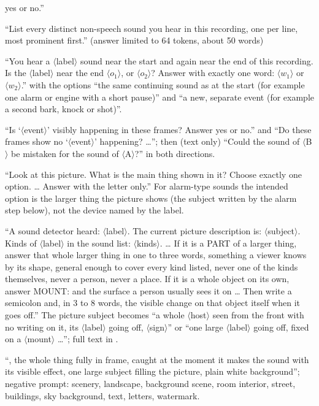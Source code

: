 \begin{description}[style=nextline]
  yes or no.''
\item[Listener inventory] ``List every distinct non-speech sound you hear in this recording, one per line, most prominent
  first.'' (answer limited to 64 tokens, about 50 words)
\item[Grouping (Qwen3-Omni, both orders)] ``You hear a $\langle$label$\rangle$ sound near the start and again near the end
  of this recording. Is the $\langle$label$\rangle$ near the end $\langle o_1\rangle$, or $\langle o_2\rangle$? Answer with
  exactly one word: $\langle w_1\rangle$ or $\langle w_2\rangle$.'' with the options ``the same continuing sound as at the
  start (for example one alarm or engine with a short pause)'' and ``a new, separate event (for example a second bark,
  knock or shot)''.
\item[Depict-event] ``Is `$\langle$event$\rangle$' visibly happening in these frames? Answer yes or no.'' and ``Do these
  frames show no `$\langle$event$\rangle$' happening? \ldots''; then (text only) ``Could the sound of $\langle$B$\rangle$ be
  mistaken for the sound of $\langle$A$\rangle$?'' in both directions.
\item[Picture check] ``Look at this picture. What is the main thing shown in it? Choose exactly one option. \ldots{}
  Answer with the letter only.'' For alarm-type sounds the intended option is the larger thing the picture shows
  (the subject written by the alarm step below), not the device named by the label.
\item[Alarm-family host question (text only)] ``A sound detector heard: $\langle$label$\rangle$. The current picture
  description is: $\langle$subject$\rangle$. Kinds of $\langle$label$\rangle$ in the sound list: $\langle$kinds$\rangle$.
  \ldots{} If it is a PART of a larger thing, answer that whole larger thing in one to three words, something a viewer
  knows by its shape, general enough to cover every kind listed, never one of the kinds themselves, never a person, never
  a place. If it is a whole object on its own, answer MOUNT: and the surface a person usually sees it on \ldots{} Then
  write a semicolon and, in 3 to 8 words, the visible change on that object itself when it goes off.'' The picture
  subject becomes ``a whole $\langle$host$\rangle$ seen from the front with no writing on it, its $\langle$label$\rangle$
  going off, $\langle$sign$\rangle$'' or ``one large $\langle$label$\rangle$ going off, fixed on a $\langle$mount$\rangle$
  \ldots''; full text in .
\item[Picture prompt tail] ``, the whole thing fully in frame, caught at the moment it makes the sound with its visible
  effect, one large subject filling the picture, plain white background''; negative prompt: scenery, landscape,
  background scene, room interior, street, buildings, sky background, text, letters, watermark.
\end{description}
